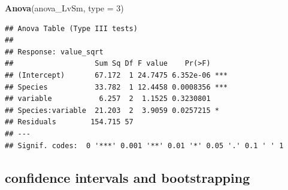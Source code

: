 \documentclass[]{article}
\newenvironment{Shaded}{\begin{snugshade}}{\end{snugshade}}
\newcommand{\KeywordTok}[1]{\textcolor[rgb]{0.13,0.29,0.53}{\textbf{{#1}}}}
\newcommand{\DataTypeTok}[1]{\textcolor[rgb]{0.13,0.29,0.53}{{#1}}}
\newcommand{\DecValTok}[1]{\textcolor[rgb]{0.00,0.00,0.81}{{#1}}}
\newcommand{\NormalTok}[1]{{#1}}
\begin{document}
\begin{Shaded}
\begin{Highlighting}[]
\KeywordTok{Anova}\NormalTok{(anova_LvSm, }\DataTypeTok{type =} \DecValTok{3}\NormalTok{)}
\end{Highlighting}
\end{Shaded}

\begin{verbatim}
## Anova Table (Type III tests)
## 
## Response: value_sqrt
##                   Sum Sq Df F value    Pr(>F)    
## (Intercept)       67.172  1 24.7475 6.352e-06 ***
## Species           33.782  1 12.4458 0.0008356 ***
## variable           6.257  2  1.1525 0.3230801    
## Species:variable  21.203  2  3.9059 0.0257215 *  
## Residuals        154.715 57                      
## ---
## Signif. codes:  0 '***' 0.001 '**' 0.01 '*' 0.05 '.' 0.1 ' ' 1
\end{verbatim}

\subsection{confidence intervals and
bootstrapping}\label{confidence-intervals-and-bootstrapping-1}
\end{document}

